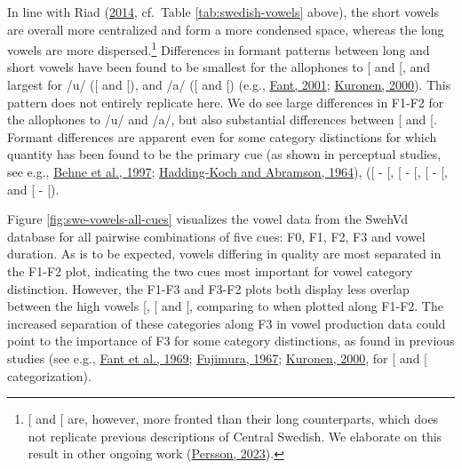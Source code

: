 \documentclass[utf8]{frontiersSCNS}
\begin{document}
In line with Riad (\protect\hyperlink{ref-riad2014}{2014}, cf.~Table \ref{tab:swedish-vowels} above), the short vowels are overall more centralized and form a more condensed space, whereas the long vowels are more dispersed.\footnote{{[}\ipatext{ɪ}{]} and {[}\ipatext{ʏ}{]} are, however, more fronted than their long counterparts, which does not replicate previous descriptions of Central Swedish. We elaborate on this result in other ongoing work (\protect\hyperlink{ref-persson2023}{Persson, 2023}).} Differences in formant patterns between long and short vowels have been found to be smallest for the allophones to {[}\ipatext{ɛ}{]} and {[}\ipatext{ø}{]}, and largest for /u/ ({[}\ipatext{ʉː}{]} and {[}\ipatext{ɵ}{]}), and /a/ ({[}\ipatext{ɑː}{]} and {[}\ipatext{a}{]}) (e.g., \protect\hyperlink{ref-fant2001}{Fant, 2001}; \protect\hyperlink{ref-kuronen2000}{Kuronen, 2000}). This pattern does not entirely replicate here. We do see large differences in F1-F2 for the allophones to /u/ and /a/, but also substantial differences between {[}\ipatext{ɛ}{]} and {[}\ipatext{ɛː}{]}. Formant differences are apparent even for some category distinctions for which quantity has been found to be the primary cue (as shown in perceptual studies, see e.g., \protect\hyperlink{ref-behne1997}{Behne et al., 1997}; \protect\hyperlink{ref-haddingkoch1964}{Hadding-Koch and Abramson, 1964}), ({[}\ipatext{ɛː}{]} - {[}\ipatext{ɛ}{]}, {[}\ipatext{øː}{]} - {[}\ipatext{ø}{]}, {[}\ipatext{iː}{]} - {[}\ipatext{ɪ}{]}, and {[}\ipatext{oː}{]} - {[}\ipatext{ɔ}{]}).

Figure \ref{fig:swe-vowels-all-cues} visualizes the vowel data from the SwehVd database for all pairwise combinations of five cues: F0, F1, F2, F3 and vowel duration. As is to be expected, vowels differing in quality are most separated in the F1-F2 plot, indicating the two cues most important for vowel category distinction. However, the F1-F3 and F3-F2 plots both display less overlap between the high vowels {[}\ipatext{iː}{]}, {[}\ipatext{yː}{]} and {[}\ipatext{ʉː}{]}, comparing to when plotted along F1-F2. The increased separation of these categories along F3 in vowel production data could point to the importance of F3 for some category distinctions, as found in previous studies (see e.g., \protect\hyperlink{ref-fant1969}{Fant et al., 1969}; \protect\hyperlink{ref-fujimura1967}{Fujimura, 1967}; \protect\hyperlink{ref-kuronen2000}{Kuronen, 2000}, for {[}\ipatext{iː}{]} and {[}\ipatext{yː}{]} categorization).
\end{document}
